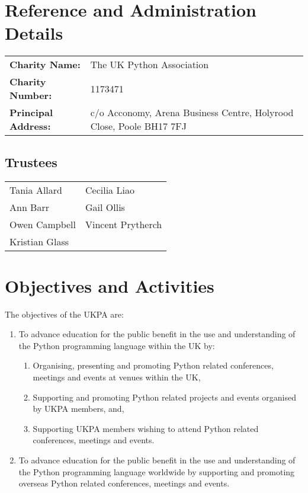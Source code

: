 \documentclass[11pt, final]{article}
\begin{document}

    \section{Reference and Administration Details}
    \begin{tabular}{l l}
        \textbf{Charity Name:} & The UK Python Association \\
        \textbf{Charity Number:} & 1173471 \\
        \textbf{Principal Address:} & c/o Acconomy, Arena Business Centre, Holyrood Close, Poole BH17 7FJ\\
    \end{tabular}

        \subsection{Trustees}
        \begin{tabular}{l l}
    	        Tania Allard & Cecilia Liao\\
                Ann Barr & Gail Ollis\\
                Owen Campbell & Vincent Prytherch\\
                Kristian Glass & \\
        \end{tabular}

    \section{Objectives and Activities}
	The objectives of the UKPA are:
	\begin{enumerate}
		\item To advance education for the public benefit in the use and understanding of the Python programming language within the UK by:
		\begin{enumerate}
			\item Organising, presenting and promoting Python related conferences, meetings and events at venues within the UK,
			\item Supporting and promoting Python related projects and events organised by UKPA members, and,
			\item Supporting UKPA members wishing to attend Python related conferences, meetings and events.
		\end{enumerate}
		\item To advance education for the public benefit in the use and understanding of the Python programming language worldwide by supporting and promoting overseas Python related conferences, meetings and events.
	\end{enumerate}
\end{document}
